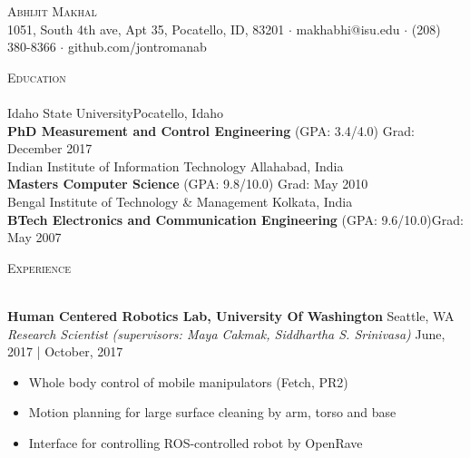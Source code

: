 \documentclass[a4paper]{article}
\newcommand{\lineunder} {
    \vspace*{-8pt} \\
    \hspace*{-18pt} \hrulefill \\
}
\newcommand{\header} [1] {
    {\hspace*{-18pt}\vspace*{6pt} \textsc{#1}}
    \vspace*{-6pt} \lineunder
}
\begin{document}
\vspace*{-40pt}

\vspace*{-10pt}
\begin{center}
	{\Huge \scshape {Abhijit Makhal}}\\
	1051, South 4th ave, Apt 35, Pocatello, ID, 83201 $\cdot$ makhabhi@isu.edu $\cdot$ (208) 380-8366 $\cdot$ github.com/jontromanab\\
\end{center}

\vspace*{2mm}

\header{Education}
Idaho State University\hfill Pocatello, Idaho\\
\textbf{PhD Measurement and Control Engineering} (GPA: 3.4/4.0) \hfill Grad: December 2017\\
\vspace{2mm}
Indian Institute of Information Technology \hfill Allahabad, India\\
\textbf{Masters Computer Science} (GPA: 9.8/10.0) \hfill Grad: May 2010\\
\vspace{2mm}
Bengal Institute of Technology \& Management \hfill Kolkata, India\\
\textbf{BTech Electronics and Communication Engineering} (GPA: 9.6/10.0)\hfill Grad: May 2007\\
\vspace{2mm}

\vspace*{2mm}

\header{Experience}
\vspace{1mm}

\textbf{Human Centered Robotics Lab, University Of Washington} \hfill Seattle, WA\\
\textit{Research Scientist (supervisors: Maya Cakmak, Siddhartha S. Srinivasa)}
\hfill  June, 2017 | October, 2017\\
\vspace{-1mm}
\begin{itemize} \itemsep 1pt
	\item Whole body control of mobile manipulators (Fetch, PR2)
	\item Motion planning for large surface cleaning by arm, torso and base
	\item Interface for controlling ROS-controlled robot by OpenRave
\end{itemize}
\end{document}
